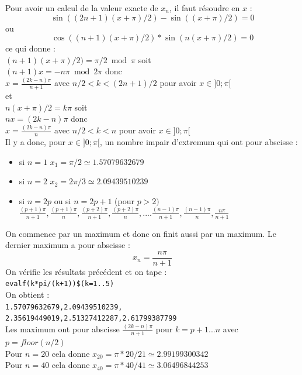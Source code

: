 \documentclass[a4paper,11pt]{book}
\begin{document}
\begin{enumerate}
Pour avoir un calcul de la valeur exacte de $x_n$, il faut r\'esoudre en $x$ :
$$\sin((2n+1)(x+\pi)/2)-\sin((x+\pi)/2)= 0$$
ou
$$\cos((n+1)(x+\pi)/2)*\sin(n(x+\pi)/2)=0$$
ce qui donne :\\
$(n+1)(x+\pi)/2)=\pi/2 \bmod \pi$
soit \\
$(n+1)x=-n\pi \bmod 2\pi$ donc\\
$\displaystyle x=\frac{(2k-n)\pi}{n+1}$ avec $n/2<k<(2n+1)/2$ pour avoir $x\in]0;\pi[$\\
et\\
$n(x+\pi)/2=k\pi$
soit \\
$nx=(2k-n)\pi$ donc \\
$\displaystyle x=\frac{(2k-n)\pi}{n}$ avec $n/2<k<n$ pour avoir $x\in]0;\pi[$\\
Il y a donc, pour $x\in]0;\pi[$, un nombre impair d'extremum qui ont pour 
abscisse :
\begin{itemize}
\item si $n=1$ $x_1=\pi/2\simeq 1.57079632679$
\item si $n=2$ $x_2=2\pi/3\simeq 2.09439510239$
\item si $n=2p$ ou si $n=2p+1$ (pour $p>2)$ \\
$\displaystyle\frac{(p+1)\pi}{n+1},\frac{(p+1)\pi}{n},\frac{(p+2)\pi}{n+1},\frac{(p+2)\pi}{n},....\frac{(n-1)\pi}{n+1},\frac{(n-1)\pi}{n},\frac{n\pi}{n+1}$
\end{itemize}
On commence par un maximum et donc on finit aussi par un maximum. 
Le dernier maximum a pour abscisse : 
$$x_n=\frac{n\pi}{n+1}$$
On v\'erifie les r\'esultats pr\'ec\'edent et on tape :\\
{\tt evalf(k*pi/(k+1))\$(k=1..5)}\\
On obtient :\\
{\tt 1.57079632679,2.09439510239,\\ 
2.35619449019,2.51327412287,2.61799387799}\\
Les maximum ont pour abscisse $\displaystyle\frac{(2k-n)\pi}{n+1}$ pour $k=p+1...n$ avec $p=floor(n/2)$\\
Pour $n=20$ cela donne
$x_{20}=\pi*20/21\simeq2.99199300342$ \\
Pour $n=40$ cela donne
$x_{40}=\pi*40/41\simeq3.06496844253$ 


\end{enumerate}
\end{document}
